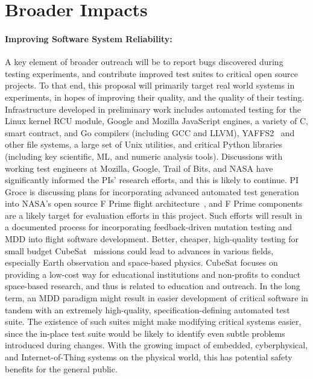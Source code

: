 \section{Broader Impacts}

\paragraph{Improving Software System Reliability:} A key element of
broader outreach will be to report bugs discovered during testing
experiments, and contribute improved test suites to critical open
source projects.  To that end, this proposal will primarily target real world
systems in experiments, in hopes of improving their quality, and
the quality of their testing.  Infrastructure developed in preliminary
work includes automated testing for
the Linux kernel RCU module, Google and Mozilla JavaScript engines, a
variety of C, smart contract, and Go compilers (including GCC and LLVM), YAFFS2~\cite{yaffs2}
and other file systems, a large set of Unix
utilities, and critical Python libraries (including key scientific, ML, and numeric
analysis tools).  Discussions with working test
engineers at Mozilla, Google, Trail of Bits, and NASA have significantly informed the PIs'
research efforts, and this is likely to continue.  PI Groce is
discussing plans for incorporating advanced automated
test generation into NASA's open source F Prime flight
architecture~\cite{fprime,fprimerepo}, 
and F Prime components are a likely target
for evaluation efforts in this project.  Such efforts will
result in a documented process for incorporating feedback-driven
mutation testing and MDD into flight software development.
Better, cheaper, high-quality testing for small budget CubeSat~\cite{CubeSat}
missions could lead to advances in various fields, especially Earth
observation and space-based physics.  CubeSat focuses on providing a
low-cost way for educational institutions and non-profits to conduct space-based
research, and thus is related to education and outreach.
In the long term,
an MDD paradigm might result in
easier development of critical software in tandem with an
extremely high-quality, specification-defining automated test suite.
The existence of such suites might make modifying critical systems
easier, since the in-place test suite would be likely to identify even
subtle problems introduced during changes.  With the growing
impact of embedded, cyberphysical, and Internet-of-Thing systems on
the physical world, this has potential safety benefits for the general public.

